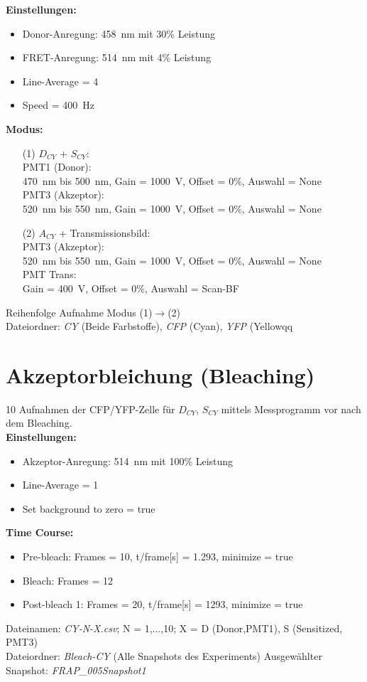 \textbf{Einstellungen:}
\begin{itemize}
    \item Donor-Anregung: \SI{458}{\nano\metre} mit 30\% Leistung
    \item FRET-Anregung: \SI{514}{\nano\metre} mit 4\% Leistung 
    \item Line-Average = 4
    \item Speed = \SI{400}{\hertz}
\end{itemize}
\newpage
\textbf{Modus:}
\begin{itemize}
    \item[(1)] $D_{CY}$ + $S_{CY}$:\\
    PMT1 (Donor):\\
    \SI{470}{\nano\metre} bis \SI{500}{\nano\metre}, Gain = \SI{1000}{\volt}, Offset = 0\%, Auswahl = None\\
    PMT3 (Akzeptor):\\
    \SI{520}{\nano\metre} bis \SI{550}{\nano\metre}, Gain = \SI{1000}{\volt}, Offset = 0\%, Auswahl = None
    \item[(2)] $A_{CY}$ + Transmissionsbild:\\
    PMT3 (Akzeptor):\\
     \SI{520}{\nano\metre} bis \SI{550}{\nano\metre}, Gain = \SI{1000}{\volt}, Offset = 0\%, Auswahl = None\\
    PMT Trans:\\
    Gain = \SI{400}{\volt}, Offset = 0\%, Auswahl = Scan-BF\\
\end{itemize} 
Reihenfolge Aufnahme Modus (1)$\rightarrow$(2)\\
Dateiordner: \textit{CY} (Beide Farbstoffe), \textit{CFP} (Cyan), \textit{YFP} (Yellowqq

\section*{Akzeptorbleichung (Bleaching)}
10 Aufnahmen der CFP/YFP-Zelle für $D_{CY}$, $S_{CY}$ mittels Messprogramm vor nach dem Bleaching.\\

\textbf{Einstellungen:}
\begin{itemize}
    \item Akzeptor-Anregung: \SI{514}{\nano\metre} mit 100\% Leistung
    \item Line-Average = 1
    \item Set background to zero = true
\end{itemize}
\textbf{Time Course:}
\begin{itemize}
    \item Pre-bleach: Frames = 10, t/frame[s] = 1.293, minimize = true
    \item Bleach: Frames = 12
    \item Post-bleach 1: Frames = 20, t/frame[s] = 1293, minimize = true
\end{itemize}
Dateinamen: \textit{CY-N-X.csv}; N = 1,...,10; X = D (Donor,PMT1), S (Sensitized, PMT3)\\
Dateiordner: \textit{Bleach-CY} (Alle Snapshots des Experiments) Ausgewählter Snapshot: \textit{FRAP\_005Snapshot1}\\

